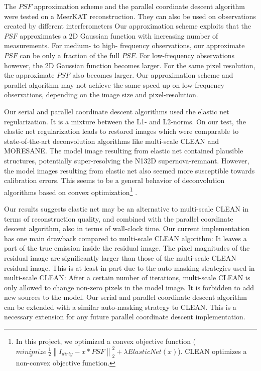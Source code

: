 The $PSF$ approximation scheme and the parallel coordinate descent algorithm were tested on a MeerKAT reconstruction. They can also be used on observations created by different interferometers Our approximation scheme exploits that the $PSF$ approximates a 2D Gaussian function with increasing number of measurements. For medium- to high- frequency observations, our approximate $PSF$ can be only a fraction of the full $PSF$. For low-frequency observations however, the 2D Gaussian function becomes larger. For the same pixel resolution, the approximate $PSF$ also becomes larger. Our approximation scheme and parallel algorithm may not achieve the same speed up on low-frequency observations, depending on the image size and pixel-resolution. 


Our serial and parallel coordinate descent algorithms used the elastic net regularization. It is a mixture between the L1- and L2-norms. On our test, the elastic net regularization leads to restored images which were comparable to state-of-the-art deconvolution algorithms like multi-scale CLEAN and MORESANE. The model image resulting from elastic net contained plausible structures, potentially super-resolving the N132D supernova-remnant. However, the model images resulting from elastic net also seemed more susceptible towards calibration errors. This seems to be a general behavior of deconvolution algorithms based on convex optimization\footnote{In this project, we optimized a convex objective function ($\underset{x}{minimize} \: \frac{1}{2} \left \| I_{dirty} - x * PSF \right \|_2^2 + \lambda ElasticNet(x)$). CLEAN optimizes a non-convex objective function.} \cite{offringa2017optimized}.

Our results suggests elastic net may be an alternative to multi-scale CLEAN in terms of reconstruction quality, and combined with the parallel coordinate descent algorithm, also in terms of wall-clock time. Our current implementation has one main drawback compared to multi-scale CLEAN algorithm: It leaves  a part of the true emission inside the residual image. The pixel magnitudes of the residual image are significantly larger than those of the multi-scale CLEAN residual image. This is at least in part due to the auto-masking strategies used in multi-scale CLEAN: After a certain number of iterations, multi-scale CLEAN is only allowed to change non-zero pixels in the model image. It is forbidden to add new sources to the model. Our serial and parallel coordinate descent algorithm can be extended with a similar auto-masking strategy to CLEAN. This is a necessary extension for any future parallel coordinate descent implementation.

